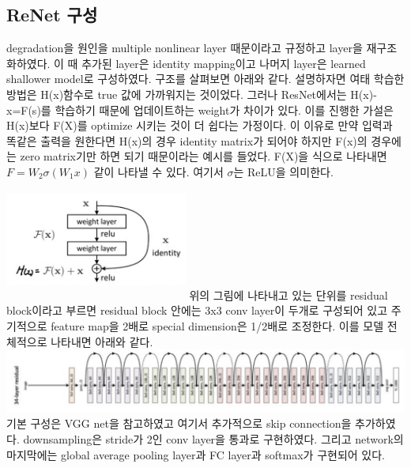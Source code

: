 \documentclass[extendedabs]{bmvc2k}
\begin{document}
\subsection{ReNet 구성}
degradation을 원인을 multiple nonlinear layer 때문이라고 규정하고 layer을 재구조화하였다. 이 때 추가된 layer은 identity mapping이고 나머지 layer은 learned shallower model로 구성하였다. 
구조를 살펴보면 아래와 같다. 설명하자면 여태 학습한 방법은 H(x)함수로 true 값에 가까워지는 것이었다. 그러나 ResNet에서는 H(x)-x=F(s)를 학습하기 때문에 업데이트하는 weight가 차이가 있다.
이를 진행한 가설은 H(x)보다 F(X)를 optimize 시키는 것이 더 쉽다는 가정이다. 이 이유로 만약 입력과 똑같은 출력을 원한다면 H(x)의 경우 identity matrix가 되어야 하지만
F(x)의 경우에는 zero matrix기만 하면 되기 때문이라는 예시를 들었다. F(X)을 식으로 나타내면 $F=W_2\sigma(W_1x)$ 같이 나타낼 수 있다. 여기서 $\sigma$는 ReLU을 의미한다.   
\newline  \includegraphics[width=6cm, height=4cm]{images/10_residual.PNG}
\newline 위의 그림에 나타내고 있는 단위를 residual block이라고 부르면 residual block 안에는 3x3 conv layer이 두개로 구성되어 있고 주기적으로 feature map을 2배로 
special dimension은 1/2배로 조정한다. 이를 모델 전체적으로 나타내면 아래와 같다. 
\newline  \includegraphics[width=\linewidth]{images/11_residual.PNG}
\newline 기본 구성은 VGG net을 참고하였고 여기서 추가적으로 skip connection을 추가하였다. downsampling은 stride가 2인 conv layer을 통과로 구현하였다.
그리고 network의 마지막에는 global average pooling layer과 FC layer과 softmax가 구현되어 있다.
\end{document}
